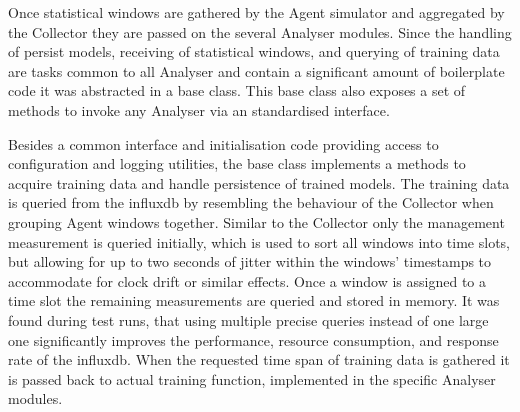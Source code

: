 \begin{comment}
\begin{itemize}
	\item non functional base class, unifying commonly used functions for analyser modules, including
		\subitem logging and config setup
		\subitem model persistence (loading and saving)
		\subitem acquiring training data from \gls{influxdb}
		\subitem common entrypoint functions for training and analyse modes
	\item training data is generated by first querying the \code{agent\_status} metric for the requested training period
	\item this metric is used to group the different agents by time slots, similar to what the collector (cf. Section~\ref{sec:impl:collector}) is doing
		\subitem fuzzy, allowing for up to 2 seconds between the capture timestamps of the different windows
		\subitem accommodate for clock drift of the agents and delays, jitter, etc of the transport
	\item once the grouping is finished the remaining metrics are queried for all windows in a time slots
	\item reduced RAM overhead during the querying and enables better (fuzzy) grouping, mitigating shortcoming in the \gls{influxdb} query language
\end{itemize}
\end{comment}

Once statistical windows are gathered by the Agent simulator and aggregated by the Collector they are passed on the several Analyser modules.
Since the handling of persist models, receiving of statistical windows, and querying of training data are tasks common to all Analyser and contain a significant amount of boilerplate code it was abstracted in a base class.
This base class also exposes a set of methods to invoke any Analyser via an standardised interface.

Besides a common interface and initialisation code providing access to configuration and logging utilities, the base class implements a methods to acquire training data and handle persistence of trained models.
The training data is queried from the \gls{influxdb} by resembling the behaviour of the Collector when grouping Agent windows together.
Similar to the Collector only the management measurement is queried initially, which is used to sort all windows into time slots, but allowing for up to two seconds of jitter within the windows' timestamps to accommodate for clock drift or similar effects.
Once a window is assigned to a time slot the remaining measurements are queried and stored in memory. It was found during test runs, that using multiple precise queries instead of one large one significantly improves the performance, resource consumption, and response rate of the \gls{influxdb}.
When the requested time span of training data is gathered it is passed back to actual training function, implemented in the specific Analyser modules.

